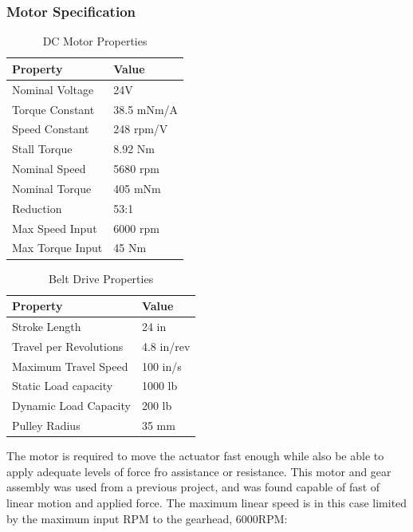 \documentclass[12pt]{report}
\begin{document}
	

	\subsubsection{Motor Specification}
	
	\begin{table}[h]
	\centering
	\caption{DC Motor Properties}	
	\begin{tabular}{|l|l|}
		\hline
		\rowcolor{gray!10} \textbf{Property} & \textbf{Value}  \\ \hline
 		Nominal Voltage & 24V  \\ \hline
 		Torque Constant & 38.5 mNm/A \\ \hline
 		Speed Constant & 248 rpm/V  \\ \hline
 		Stall Torque & 8.92 Nm \\ \hline
 		Nominal Speed & 5680 rpm \\ \hline
 		Nominal Torque & 405 mNm \\ \hline
 		Reduction & 53:1  \\ \hline
 		Max Speed Input & 6000 rpm  \\ \hline
 		Max Torque Input & 45 Nm  \\ \hline
		\end{tabular}
	\label{tab:motor}
	\end{table}
	
	
	\begin{table}[h]
	\centering
	\caption{Belt Drive Properties}	
	\begin{tabular}{|l|l|}
		\hline
		\rowcolor{gray!10} \textbf{Property} & \textbf{Value}  \\ \hline
		Stroke Length & 24 in  \\ \hline
 		Travel per Revolutions & 4.8 in/rev  \\ \hline
 		Maximum Travel Speed & 100 in/s  \\ \hline
 		Static Load capacity & 1000 lb  \\ \hline
 		Dynamic Load Capacity & 200 lb  \\ \hline
 		Pulley Radius & 35 mm  \\ \hline
		\end{tabular}
	\label{tab:belt}
	\end{table}
	

	
	The motor is required to move the actuator fast enough while also be able to apply adequate levels of force fro assistance or resistance. This motor and gear assembly was used from a previous project, and was found capable of fast of linear motion and applied force. The maximum linear speed is in this case limited by the maximum input RPM to the gearhead, 6000RPM: 
	
\end{document}
